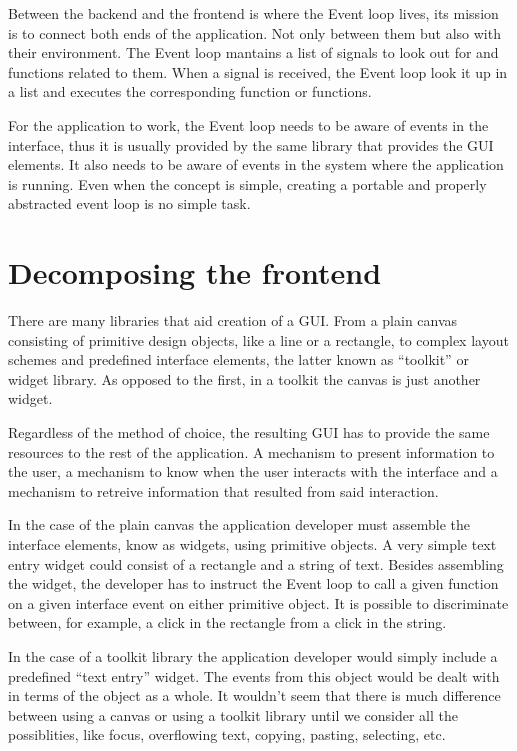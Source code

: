 \documentclass[12pt,a4paper,english]{book}
\begin{document}
Between the backend and the frontend is where the Event loop lives, its mission
is to connect both ends of the application. Not only between them but also with
their environment. The Event loop mantains a list of signals to look out for
and functions related to them. When a signal is received, the Event loop look
it up in a list and executes the corresponding function or functions.

For the application to work, the Event loop needs to be aware of events in the
interface, thus it is  usually provided by the same library that provides the
GUI elements. It also needs to be aware of events in the system where the
application is running. Even when the concept is simple, creating a portable
and properly abstracted event loop is no simple task.



\hypertarget{decomposing-the-frontend}{}
\section{Decomposing the frontend}
\label{decomposing-the-frontend}

There are many libraries that aid creation of a GUI. From a plain canvas
consisting of primitive design objects, like a line or a rectangle, to complex
layout schemes and predefined interface elements, the latter known as ``toolkit''
or widget library. As opposed to the first, in a toolkit the canvas is just
another widget.

Regardless of the method of choice, the resulting GUI has to provide the same
resources to the rest of the application. A mechanism to present information
to the user, a mechanism to know when the user interacts with the interface and
a mechanism to retreive information that resulted from said interaction.

In the case of the plain canvas the application developer must assemble the
interface elements, know as widgets, using primitive objects. A very simple
text entry widget could consist of a rectangle and a string of text. Besides
assembling the widget, the developer has to instruct the Event loop  to call a
given function on a given interface event on either primitive object. It is
possible to discriminate between, for example, a click in the rectangle from a
click in the string.

In the case of a toolkit library the application developer would simply include
a predefined ``text entry'' widget. The events from this object would be dealt
with in terms of the object as a whole. It wouldn't seem that there is much
difference between using a canvas or using a toolkit library until we consider
all the possiblities, like focus, overflowing text, copying, pasting,
selecting, etc.
\end{document}
